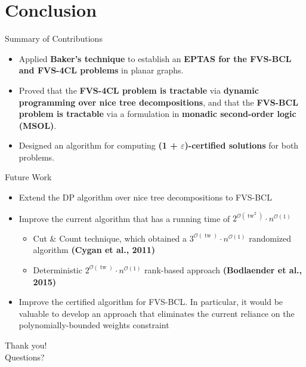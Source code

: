 \documentclass{beamer}
\newcommand{\tw}{\operatorname{tw}}
\begin{document}
\section{Conclusion}

\begin{frame}{Summary of Contributions}
\begin{itemize}
    \item Applied \textbf{Baker's technique} to establish an 
    \textbf{EPTAS for the FVS-BCL and FVS-4CL problems} in planar graphs.
    
    \item Proved that the \textbf{FVS-4CL problem is tractable} via 
    \textbf{dynamic programming over nice tree decompositions}, and that the 
    \textbf{FVS-BCL problem is tractable} via a formulation in 
    \textbf{monadic second-order logic (MSOL)}.
    
    \item Designed an algorithm for computing 
    \textbf{(1 + $\varepsilon$)-certified solutions} for both problems.

\end{itemize}
\end{frame}


\begin{frame}{Future Work}
  \begin{itemize}
    \item Extend the DP algorithm over nice tree decompositions to FVS-BCL
    \item Improve the current algorithm that has a running time of 
    $2^{\mathcal{O}(\tw^2)} \cdot n^{\mathcal{O}(1)}$
    \begin{itemize} 
    \item Cut \& Count technique, which obtained a 
    $3^{\mathcal{O}(\tw)} \cdot n^{\mathcal{O}(1)}$ randomized algorithm
    \textbf{(Cygan et al., 2011)}  

    \item Deterministic 
    $2^{\mathcal{O}(\tw)} \cdot n^{\mathcal{O}(1)}$ rank-based approach
    \textbf{(Bodlaender et al., 2015)}

    \end{itemize}
    \item  Improve the certified algorithm for FVS-BCL. 
    In particular, it would be valuable to develop an approach that eliminates the current 
    reliance on the polynomially-bounded weights constraint
  \end{itemize}
\end{frame}

\begin{frame}
  \centering
  \Huge Thank you!\\
  \vspace{0.5cm}
  \Large Questions?
\end{frame}
\end{document}
